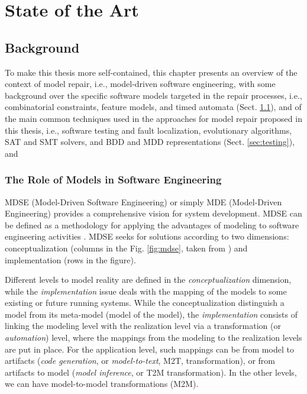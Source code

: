 \part{State of the Art}

\chapter{Background}\label{ch:background}

To make this thesis more self-contained, this chapter presents an overview of the context of model repair, i.e., model-driven software engineering, with some background over the specific software models targeted in the repair processes, i.e., combinatorial constraints, feature models, and timed automata (Sect. \ref{sec:modeldriven}), and of the main common techniques used in the approaches for model repair proposed in this thesis, i.e., software testing and fault localization, evolutionary algorithms, SAT and SMT solvers, and BDD and MDD representations (Sect. \ref{sec:testing}), and 

\section{The Role of Models in Software Engineering}\label{sec:modeldriven}

MDSE (Model-Driven Software Engineering) or simply MDE (Model-Driven Engineering) provides a comprehensive vision for system development. 
MDSE can be defined as a methodology for applying the advantages of modeling to software engineering activities \cite{brambillaModelDriven,hachem2016towards}.
MDSE seeks for solutions according to two dimensions: conceptualization (columns in the Fig. \ref{fig:mdse}, taken from \cite{brambillaModelDriven}) and implementation (rows in the figure).

Different levels to model reality are defined in the \textit{conceptualization} dimension, 
while the \textit{implementation} issue deals with the mapping of the models to some existing or future running systems. 
While the conceptualization distinguish a model from its meta-model (model of the model), the \textit{implementation} consists of linking the modeling level with the realization level via a transformation (or \textit{automation}) level, where the mappings from the modeling to the realization levels are put in place.
For the application level, such mappings can be from model to artifacts (\textit{code generation}, or \textit{model-to-text}, M2T, transformation), or from artifacts to model (\textit{model inference}, or T2M transformation). In the other levels, we can have model-to-model transformations (M2M).

